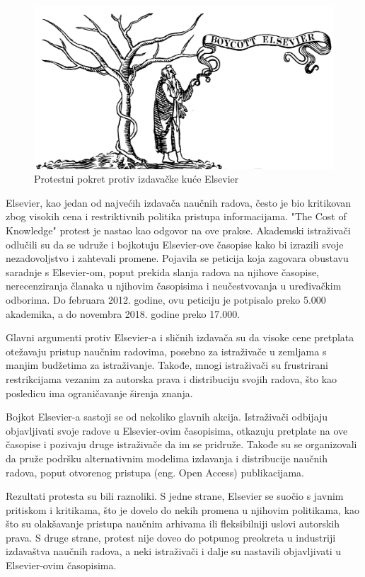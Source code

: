 \documentclass{article}
\begin{document}
\begin{figure}[htbp]
    \center
    \includegraphics[scale=0.1]{img/Boycott_Elsevier.png}
    \caption{Protestni pokret protiv izdavačke kuće Elsevier}
\end{figure}

Elsevier, kao jedan od najvećih izdavača naučnih radova, često je bio kritikovan zbog visokih cena i restriktivnih politika pristupa informacijama. "The Cost of Knowledge" protest je nastao kao odgovor na ove prakse. Akademski istraživači odlučili su da se udruže i bojkotuju Elsevier-ove časopise kako bi izrazili svoje nezadovoljstvo i zahtevali promene. Pojavila se peticija koja zagovara obustavu saradnje s Elsevier-om, poput prekida slanja radova na njihove časopise, nerecenziranja članaka u njihovim časopisima i neučestvovanja u uređivačkim odborima. Do februara 2012. godine, ovu peticiju je potpisalo preko 5.000 akademika, a do novembra 2018. godine preko 17.000.

Glavni argumenti protiv Elsevier-a i sličnih izdavača su da visoke cene pretplata otežavaju pristup naučnim radovima, posebno za istraživače u zemljama s manjim budžetima za istraživanje. Takođe, mnogi istraživači su frustrirani restrikcijama vezanim za autorska prava i distribuciju svojih radova, što kao posledicu ima ograničavanje širenja znanja.

Bojkot Elsevier-a sastoji se od nekoliko glavnih akcija. Istraživači odbijaju objavljivati svoje radove u Elsevier-ovim časopisima, otkazuju pretplate na ove časopise i pozivaju druge istraživače da im se pridruže. Takođe su se organizovali da pruže podršku alternativnim modelima izdavanja i distribucije naučnih radova, poput otvorenog pristupa (eng. Open Access) publikacijama.

Rezultati protesta su bili raznoliki. S jedne strane, Elsevier se suočio s javnim pritiskom i kritikama, što je dovelo do nekih promena u njihovim politikama, kao što su olakšavanje pristupa naučnim arhivama ili fleksibilniji uslovi autorskih prava. S druge strane, protest nije doveo do potpunog preokreta u industriji izdavaštva naučnih radova, a neki istraživači i dalje su nastavili objavljivati u Elsevier-ovim časopisima.
\end{document}
